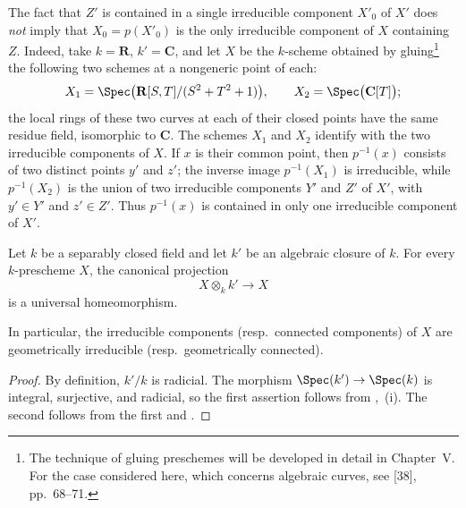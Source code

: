 \begin{remark}[4.5.20]
\label{IV.4.5.20}
The fact that $Z'$ is contained in a single irreducible component
$X'_0$ of $X'$ does \emph{not} imply that
$X_0=p(X'_0)$ is the only irreducible component of $X$ containing
$Z$.
Indeed, take $k=\mathbf R$, $k'=\mathbf C$, and let $X$ be the
$k$-scheme obtained by gluing\footnote{The technique of gluing
preschemes will be developed in detail in Chapter~V.  For the case
considered here, which concerns algebraic curves, see [38],
pp.~68--71.} the following two schemes at a nongeneric point of each:
\[
X_1=\Spec\bigl(\mathbf R[S,T]/(S^2+T^2+1)\bigr),
\qquad
X_2=\Spec\bigl(\mathbf C[T]\bigr);
\]
the local rings of these two curves at each of their closed points
have the same residue field, isomorphic to $\mathbf C$.
The schemes $X_1$ and $X_2$ identify with the two irreducible
components of $X$.
If $x$ is their common point, then $p^{-1}(x)$ consists of two
distinct points $y'$ and $z'$; the inverse image $p^{-1}(X_1)$ is
irreducible, while $p^{-1}(X_2)$ is the union of two irreducible
components $Y'$ and $Z'$ of $X'$, with $y'\in Y'$ and $z'\in Z'$.
Thus $p^{-1}(x)$ is contained in only one irreducible component of
$X'$.
\end{remark}

\begin{proposition}[4.5.21]
\label{IV.4.5.21}
Let $k$ be a separably closed field and let $k'$ be an algebraic
closure of $k$.
For every $k$-prescheme $X$, the canonical projection
\[
X\otimes_k k'\longrightarrow X
\]
is a universal homeomorphism.


In particular, the irreducible components (resp.\ connected
components) of $X$ are geometrically irreducible
(resp.\ geometrically connected).
\end{proposition}

\begin{proof}
By definition, $k'/k$ is radicial.
The morphism $\Spec(k')\to\Spec(k)$ is integral, surjective, and
radicial, so the first assertion follows from
,~(i).
The second follows from the first and .
\end{proof}
